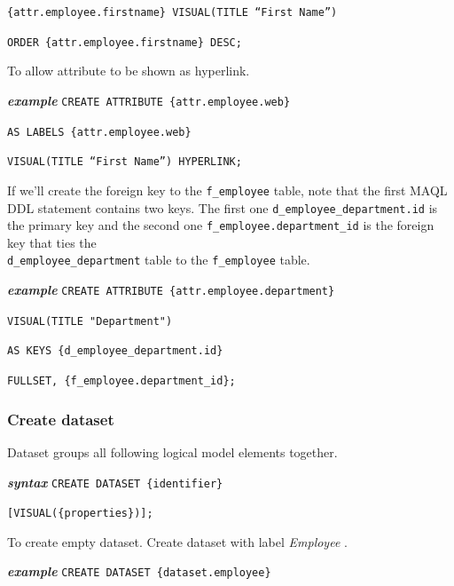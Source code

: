 \documentclass[a4paper, 12pt, titlepage, fleqn]{article}
\begin{document}
\hspace{2.5cm}\verb={attr.employee.firstname} VISUAL(TITLE “First Name”)=

\hspace{2.5cm}\verb=ORDER {attr.employee.firstname} DESC;=

\noindent To allow attribute to be shown as hyperlink.

\textbf{\emph{example}}  \hspace{.9cm}\verb=CREATE ATTRIBUTE {attr.employee.web}=

\hspace{2.5cm}\verb=AS LABELS {attr.employee.web}=

\hspace{2.5cm}\verb=VISUAL(TITLE “First Name”) HYPERLINK;=

If we’ll create the foreign key to the \verb=f_employee= table, note that the first MAQL DDL statement contains two keys. The first one \verb=d_employee_department.id= is the primary key and the second one \verb=f_employee.department_id= is the foreign key that ties the\\ \verb=d_employee_department= table to the \verb=f_employee= table.

\textbf{\emph{example}}  \hspace{.9cm}\verb=CREATE ATTRIBUTE {attr.employee.department}=

\hspace{2.5cm}\verb=VISUAL(TITLE "Department")=

\hspace{2.5cm}\verb=AS KEYS {d_employee_department.id}=

\hspace{2.5cm}\verb=FULLSET, {f_employee.department_id};=

\subsubsection{Create dataset}
Dataset groups all following logical model elements together.

\textbf{\emph{syntax}}  \hspace{.9cm}\verb=CREATE DATASET {identifier}=

\hspace{2.1cm}\verb=[VISUAL({properties})];=

\noindent To create empty dataset. Create dataset with label \emph{Employee} .

\textbf{\emph{example}}  \hspace{.9cm}\verb=CREATE DATASET {dataset.employee}=
\end{document}
